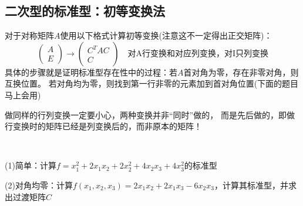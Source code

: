 \subsection{二次型的标准型：初等变换法}


\begin{theorem}
  对于对称矩阵$A$使用以下格式计算初等变换(注意这不一定得出正交矩阵)：
  \begin{equation*}
    \left(
      \begin{array}{c}
        A\\
        E
      \end{array}
    \right) \rightarrow \left(
      \begin{array}{c}
        C^TAC\\
        C
      \end{array}
    \right)\quad \text{对A行变换和对应列变换，对I只列变换}
  \end{equation*}
  具体的步骤就是证明标准型存在性中的过程：若$A$首对角为零，存在非零对角，则互换位置。
  若对角均为零，则找到第一行非零的元素加到首对角位置(下面的题目马上会用)
\end{theorem}

\begin{note}
  做同样的行列变换一定要小心，两种变换并非“同时”做的，
  而是先后做的，即做行变换时的矩阵已经是列变换后的，而非原本的矩阵！
\end{note}

~

\begin{exercise}
  (1)简单：计算$f = x_1^2 +2x_1x_2 + 2x_2^2 + 4x_2x_3 + 4x_3^2$的标准型
  
  (2)对角均零：计算$f(x_1,x_2,x_3) = 2x_1x_2 + 2x_1x_3 - 6x_2x_3$，计算其标准型，并求出过渡矩阵$C$
\end{exercise}


